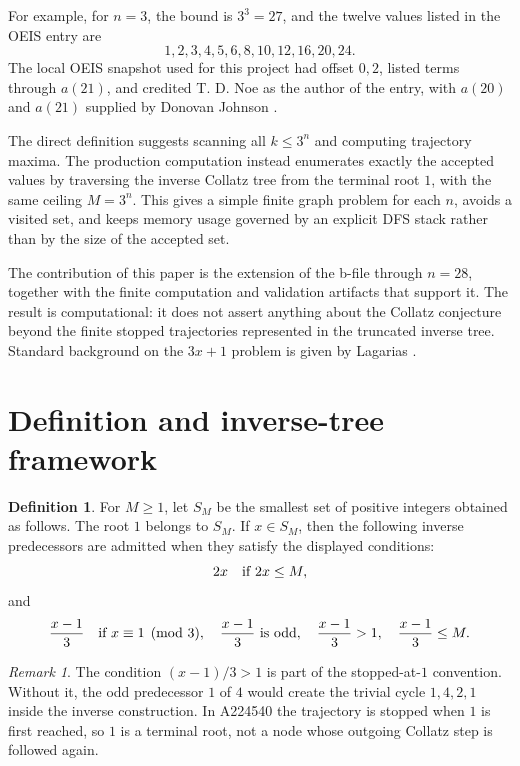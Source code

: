 \documentclass[11pt]{article}
\theoremstyle{definition}
\newtheorem{definition}[theorem]{Definition}
\theoremstyle{remark}
\newtheorem{remark}[theorem]{Remark}
\begin{document}
For example, for \(n=3\), the bound is \(3^3=27\), and the twelve values listed
in the OEIS entry are
\[
1,2,3,4,5,6,8,10,12,16,20,24.
\]
The local OEIS snapshot used for this project had offset \(0,2\), listed terms
through \(a(21)\), and credited T. D. Noe as the author of the entry, with
\(a(20)\) and \(a(21)\) supplied by Donovan Johnson \cite{oeisA224540}.

The direct definition suggests scanning all \(k\leq 3^n\) and computing
trajectory maxima.  The production computation instead enumerates exactly the
accepted values by traversing the inverse Collatz tree from the terminal root
\(1\), with the same ceiling \(M=3^n\).  This gives a simple finite graph
problem for each \(n\), avoids a visited set, and keeps memory usage governed
by an explicit DFS stack rather than by the size of the accepted set.

The contribution of this paper is the extension of the b-file through
\(n=28\), together with the finite computation and validation artifacts that
support it.  The result is computational: it does not assert anything about
the Collatz conjecture beyond the finite stopped trajectories represented in
the truncated inverse tree.  Standard background on the \(3x+1\) problem is
given by Lagarias \cite{lagarias1985,lagarias2010}.

\section{Definition and inverse-tree framework}

\begin{definition}
For \(M\geq 1\), let \(S_M\) be the smallest set of positive integers obtained
as follows.  The root \(1\) belongs to \(S_M\).  If \(x\in S_M\), then the
following inverse predecessors are admitted when they satisfy the displayed
conditions:
\[
2x \quad\hbox{if } 2x\leq M,
\]
and
\[
\frac{x-1}{3} \quad\hbox{if } x\equiv 1\pmod 3,\quad
\frac{x-1}{3}\hbox{ is odd},\quad
\frac{x-1}{3}>1,\quad
\frac{x-1}{3}\leq M.
\]
\end{definition}

\begin{remark}
The condition \((x-1)/3>1\) is part of the stopped-at-\(1\) convention.  Without
it, the odd predecessor \(1\) of \(4\) would create the trivial cycle
\(1,4,2,1\) inside the inverse construction.  In A224540 the trajectory is
stopped when \(1\) is first reached, so \(1\) is a terminal root, not a node
whose outgoing Collatz step is followed again.
\end{remark}
\end{document}
